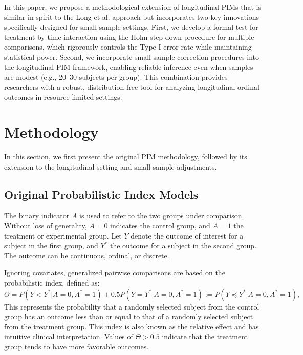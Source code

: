 \documentclass[alpha-refs]{wiley-article}
\begin{document}
In this paper, we propose a methodological extension of longitudinal PIMs that is similar in spirit to the Long et al. approach but incorporates two key innovations specifically designed for small-sample settings. First, we develop a formal test for treatment-by-time interaction using the Holm step-down procedure for multiple comparisons, which rigorously controls the Type I error rate while maintaining statistical power. Second, we incorporate small-sample correction procedures into the longitudinal PIM framework, enabling reliable inference even when samples are modest (e.g., 20--30 subjects per group). This combination provides researchers with a robust, distribution-free tool for analyzing longitudinal ordinal outcomes in resource-limited settings.

\newpage

\section{Methodology}
\label{methods}

In this section, we first present the original PIM methodology, followed by its extension to the longitudinal setting and small-sample adjustments.

\subsection{Original Probabilistic Index Models}

The binary indicator $A$ is used to refer to the two groups under comparison. Without loss of generality, $A=0$ indicates the control group, and $A=1$ the treatment or experimental group. Let $Y$ denote the outcome of interest for a subject in the first group, and $Y^*$ the outcome for a subject in the second group. The outcome can be continuous, ordinal, or discrete.

Ignoring covariates, generalized pairwise comparisons are based on the probabilistic index, defined as:
\[
  \Theta = P(Y < Y^*|A=0,A^*=1) + 0.5 P(Y = Y^*|A=0,A^*=1) := P(Y \preceq Y^*|A=0,A^*=1),
\]
This represents the probability that a randomly selected subject from the control group has an outcome less than or equal to that of a randomly selected subject from the treatment group. This index is also known as the relative effect and has intuitive clinical interpretation. Values of $\Theta > 0.5$ indicate that the treatment group tends to have more favorable outcomes.
\end{document}
